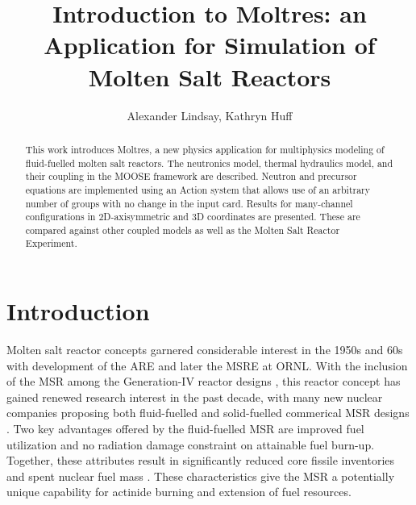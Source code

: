 \documentclass{article}
\title{Introduction to Moltres: an Application for Simulation of Molten Salt Reactors}
\author{Alexander Lindsay, Kathryn Huff}
\let\Oldsection\section
\renewcommand{\section}{\FloatBarrier\Oldsection}
\begin{document}
\maketitle

\begin{abstract}

This work introduces Moltres, a new physics application for multiphysics
modeling of fluid-fuelled molten salt reactors. The neutronics model, thermal
hydraulics model, and their coupling in the MOOSE framework are
described. Neutron and precursor equations are implemented using an Action
system that allows use of an arbitrary number of groups with no change in the
input card. Results for many-channel configurations in 2D-axisymmetric and 3D
coordinates are presented. These are compared against other coupled models as
well as the Molten Salt Reactor Experiment.

\end{abstract}

\section{Introduction}

Molten salt reactor concepts garnered considerable interest in the 1950s and 
60s with development of the \gls{ARE} and later the \gls{MSRE} at \gls{ORNL}. 
With the inclusion of the \gls{MSR} among the Generation-IV reactor designs 
\cite{gen_IV}, this reactor concept has gained renewed research interest in the 
past decade, with many new nuclear companies proposing both fluid-fuelled and 
solid-fuelled commerical \gls{MSR} designs 
\cite{terrapower,terrestrial,elysium,thorcon,kairos}. Two key advantages 
offered by the fluid-fuelled \gls{MSR} are improved fuel utilization and no 
radiation damage constraint on attainable fuel burn-up. Together, these 
attributes result in significantly reduced core fissile inventories and spent 
nuclear fuel mass \cite{noauthor_gen_2008}.  These characteristics give the 
\gls{MSR} a potentially unique capability for actinide burning and extension of 
fuel resources.
\end{document}
